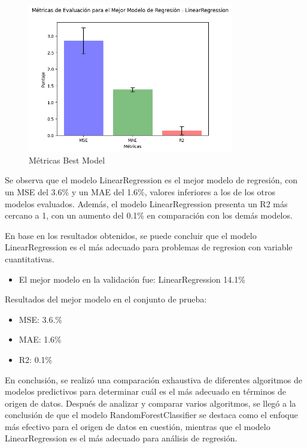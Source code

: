 \begin{figure}[H]
    \centering
    \includegraphics[width=0.8\textwidth]{img/compara_algoritmos/metricasBestModelLinearRegression.png}
    \caption{Métricas Best Model}
    \label{fig:metricas_regresion_bestModel}
\end{figure}

Se observa que el modelo LinearRegression es el mejor modelo de regresión, con un MSE del 3.6\% y un MAE del 1.6\%, valores inferiores a los de los otros modelos evaluados. Además, el modelo LinearRegression presenta un R2 más cercano a 1, con un aumento del 0.1\% en comparación con los demás modelos.

En base en los resultados obtenidos, se puede concluir que el modelo LinearRegression es el más adecuado para problemas de regresion con variable cuantitativas.

\begin{itemize}
    \item El mejor modelo en la validación fue: LinearRegression 14.1\%
\end{itemize}

Resultados del mejor modelo en el conjunto de prueba:

\begin{itemize}
    \item MSE: 3.6.\%
    \item MAE: 1.6\%
    \item R2: 0.1\%
\end{itemize}

En conclusión, se realizó una comparación exhaustiva de diferentes algoritmos de modelos predictivos para determinar cuál es el más adecuado en términos de origen de datos. Después de analizar y comparar varios algoritmos, se llegó a la conclusión de que el modelo RandomForestClassifier se destaca como el enfoque más efectivo para el origen de datos en cuestión, mientras que el modelo LinearRegression es el más adecuado para análisis de regresión.